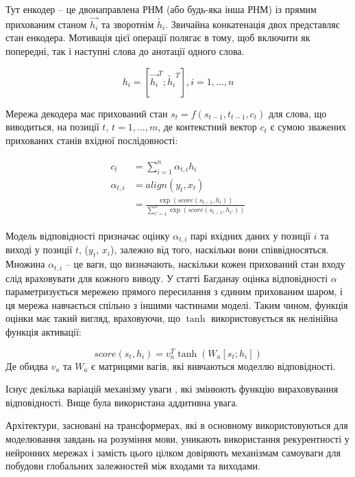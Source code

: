 \documentclass[a4paper,14pt]{extreport}
\begin{document}
Тут енкодер -- це двонаправлена РНМ (або будь-яка інша РНМ) із прямим
прихованим станом $\overrightarrow{h_i}$ та зворотнім
$\overleftarrow{h_i}$. Звичайна конкатенація двох представляє стан
енкодера. Мотивація цієї операції
полягає в тому, щоб включити як попередні, так і наступні
слова до анотації одного слова.

\begin{equation}
    h_i = [\overrightarrow{h_i}^T;\overleftarrow{h_i}^T], i=1, ..., n
\end{equation}

Мережа декодера має прихований стан $s_t = f(s_{t-1},t_{t-1},c_t)$
для слова, що виводиться, на позиції $t$, $t = 1, ..., m$,
де контекстний вектор $c_t$ є сумою зважених прихованих станів
вхідної послідовності:

\begin{gather}
\begin{aligned}
    c_t          &= \sum^n_{i=1}\alpha_{t,i} h_i \\
    \alpha_{t,i} &= align(y_t,x_t) \\
    &= \frac{\exp(score(s_{t-1}, h_i))}{\sum^n_{i'=1}\exp(score(s_{t-1},h_{i'}))}
\end{aligned}
\end{gather}

Модель відповідності призначає оцінку $\alpha_{t,i}$
парі вхідних даних у позиції $i$ та виході у позиції $t$, ($y_t$, $x_i$),
залежно від того, наскільки вони співвідносяться. Множина
${α_{t,i}}$ -- це ваги, що визначають, наскільки кожен прихований стан
входу слід враховувати для кожного виводу.
У статті Багданау \cite{nn:attention} оцінка відповідності
$α$ параметризується мережею прямого пересилання
з єдиним прихованим шаром, і ця мережа навчається спільно з
іншими частинами моделі. Таким чином, функція оцінки
має такий вигляд, враховуючи, що $\tanh$ використовується як
нелінійна функція активації:

\begin{equation}
    score(s_t, h_i) = v^T_a \tanh(W_a [s_t;h_i])
\end{equation}
Де обидва $v_a$ та $W_a$ є матрицями вагів, які вивчаються
моделлю відповідності.

Існує декілька варіацій механізму
уваги \cite{attention:1} \cite{attention:2}, які змінюють
функцію вираховування відповідності. Вище
була використана аддитивна \cite{nn:attention} увага.

Архітектури, засновані на трансформерах, які в основному
використовуються для моделювання завдань на розуміння мови,
уникають використання рекурентності у нейронних мережах і замість
цього цілком довіряють механізмам самоуваги для побудови
глобальних залежностей між входами та виходами.
\end{document}
